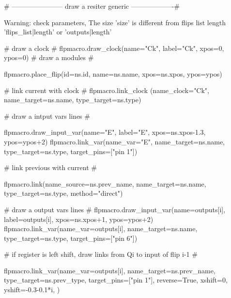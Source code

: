 {%
{%
{%
{# -----------------------
 draw a resiter generic
-------------------#}
{%

{%
 Warning: check parameters, The size '{{size}}' is different from flips list length '{{flips_list|length}}' or
 '{{outputs|length}}'
{%
    {# draw a clock #}
    {{ flpmacro.draw_clock(name="Ck", label="Ck", xpos=0, ypos=0)}}
    {# draw a modules #}
    {%
    {%
    {%
        {%
        {%
        {%
        {%
        {{ flpmacro.place_flip(id=ns.id, name=ns.name, xpos=ns.xpos, ypos=ypos)}}

        {# link current with clock #}
        {{ flpmacro.link_clock (name_clock="Ck", name_target=ns.name, type_target=ns.type)}}

        {# draw a intput vars lines #}
        {%
        {{ flpmacro.draw_input_var(name="E", label="E", xpos=ns.xpos-1.3, ypos=ypos+2)}}
        {{ flpmacro.link_var(name_var="E", name_target=ns.name, type_target=ns.type, target_pins=["pin 1"])}}
        {%

        {# link previous with current #}
        {%
            {{ flpmacro.link(name_source=ns.prev_name, name_target=ns.name, type_target=ns.type, method="direct")}}
        {%

       {# draw a output vars lines #}
        {{ flpmacro.draw_input_var(name=outputs[i], label=outputs[i], xpos=ns.xpos+1, ypos=ypos+2)}}
        {{ flpmacro.link_var(name_var=outputs[i], name_target=ns.name, type_target=ns.type, target_pins=["pin 6"])}}


        {# if register is left shift, draw links from Qi to input of flip i-1 #}
       {%
            {%
            {{ flpmacro.link_var(name_var=outputs[i], name_target=ns.prev_name, type_target=ns.prev_type, target_pins=["pin 1"],
                reverse=True,
                xshift=0,
                yshift=-0.3-0.1*i,
            )}}
        {%
        {%



}}}}}}}}}}}}}}}}}}}}}
